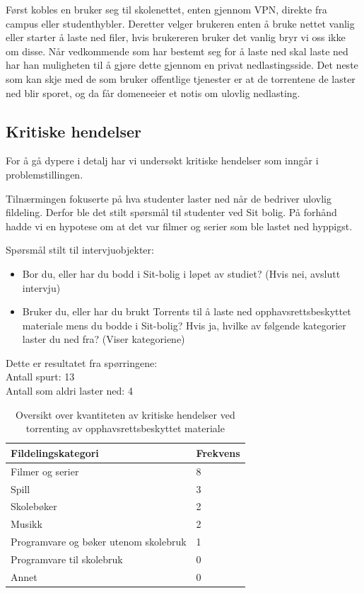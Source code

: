 Først kobles en bruker seg til skolenettet, enten gjennom VPN, direkte fra campus eller studenthybler. Deretter velger brukeren enten å bruke nettet vanlig eller starter å laste ned filer, hvis brukereren bruker det vanlig bryr vi oss ikke om disse. Når vedkommende som har bestemt seg for å laste ned skal laste ned har han muligheten til å gjøre dette gjennom en privat nedlastingsside. Det neste som kan skje med de som bruker offentlige tjenester er at de torrentene de laster ned blir sporet, og da får domeneeier et notis om ulovlig nedlasting.

\subsection{Kritiske hendelser}
For å gå dypere i detalj har vi undersøkt kritiske hendelser som inngår i problemstillingen. 

Tilnærmingen fokuserte på hva studenter laster ned når de bedriver ulovlig fildeling. Derfor ble det stilt spørsmål til studenter ved Sit bolig. På forhånd hadde vi en hypotese om at det var filmer og serier som ble lastet ned hyppigst.

Spørsmål stilt til intervjuobjekter:
\begin{itemize}
    \item Bor du, eller har du bodd i Sit-bolig i løpet av studiet? (Hvis nei, avslutt intervju)
    \item Bruker du, eller har du brukt Torrents til å laste ned opphavsrettsbeskyttet materiale mens du bodde i Sit-bolig? Hvis ja, hvilke av følgende kategorier laster du ned fra? (Viser kategoriene)
\end{itemize}

\noindent Dette er resultatet fra spørringene: \\
\indent Antall spurt: 13 \\
\indent Antall som aldri laster ned: 4
\begin{table} [H]
    \caption[Frekvensen av ulike kategorier av nedlasting]{Oversikt over kvantiteten av kritiske hendelser ved torrenting av opphavsrettsbeskyttet materiale}
    \begin{tabular}{ | m{18em} | m{18em} | }
        \hline
            \cellcolor{yellow} Fildelingskategori & \cellcolor{yellow} Frekvens \\
        \hline
            Filmer og serier & 8  \\
        \hline
            Spill & 3 \\
        \hline
            Skolebøker & 2 \\
        \hline
            Musikk & 2 \\
        \hline
            Programvare og bøker utenom skolebruk & 1 \\
        \hline
            Programvare til skolebruk & 0 \\
        \hline
            Annet & 0 \\
        \hline
    \end{tabular}
    \label{kritisk_tabell_1}
\end{table}

